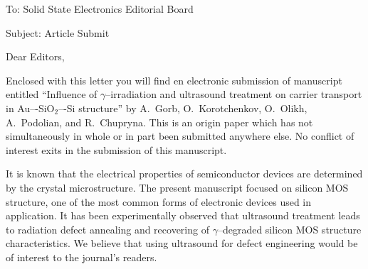 \documentclass[preprint]{elsarticle}
\begin{document}
To:
Solid State Electronics Editorial Board


Subject:
Article Submit

\vspace{5mm}
Dear Editors,

\vspace{3mm}
Enclosed with this letter you will find en electronic submission of manuscript entitled ``Influence of $\gamma$--irradiation and ultrasound treatment on carrier transport in Au–-SiO$_2$–-Si structure'' by A.~Gorb, O.~Korotchenkov, O.~Olikh, A.~Podolian, and R.~Chupryna.
This is an origin paper which has not
simultaneously in whole or in part been submitted anywhere else.
No conflict of interest exits in the submission of this manuscript.

It is known that the electrical properties of semiconductor devices are determined by the crystal microstructure.
The present manuscript focused on silicon MOS structure, one of the most common forms of electronic devices used in application.
It has been experimentally observed that ultrasound treatment leads to radiation defect annealing and recovering of $\gamma$--degraded silicon MOS structure characteristics.
We believe that using ultrasound for defect engineering would be of interest to the journal’s readers.





\end{document}
